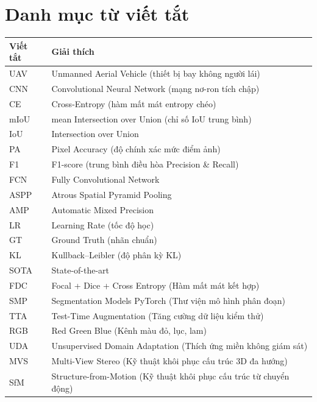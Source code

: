 \chapter*{Danh mục từ viết tắt}

\begin{center}
\begin{tabular}{l l}
\toprule
\textbf{Viết tắt} & \textbf{Giải thích} \\
\midrule
UAV    & Unmanned Aerial Vehicle (thiết bị bay không người lái) \\
CNN    & Convolutional Neural Network (mạng nơ-ron tích chập) \\
CE     & Cross-Entropy (hàm mất mát entropy chéo) \\
mIoU   & mean Intersection over Union (chỉ số IoU trung bình) \\
IoU    & Intersection over Union \\
PA     & Pixel Accuracy (độ chính xác mức điểm ảnh) \\
F1     & F1-score (trung bình điều hòa Precision \& Recall) \\
FCN    & Fully Convolutional Network \\
ASPP   & Atrous Spatial Pyramid Pooling \\
AMP    & Automatic Mixed Precision \\
LR     & Learning Rate (tốc độ học) \\
GT     & Ground Truth (nhãn chuẩn) \\
KL     & Kullback--Leibler (độ phân kỳ KL) \\
SOTA   & State-of-the-art \\
FDC    & Focal + Dice + Cross Entropy (Hàm mất mát kết hợp) \\
SMP    & Segmentation Models PyTorch (Thư viện mô hình phân đoạn) \\
TTA    & Test-Time Augmentation (Tăng cường dữ liệu kiểm thử) \\
RGB    & Red Green Blue (Kênh màu đỏ, lục, lam) \\
UDA    & Unsupervised Domain Adaptation (Thích ứng miền không giám sát) \\
MVS    & Multi-View Stereo (Kỹ thuật khôi phục cấu trúc 3D đa hướng) \\
SfM    & Structure-from-Motion (Kỹ thuật khôi phục cấu trúc từ chuyển động) \\
\bottomrule
\end{tabular}
\end{center}

